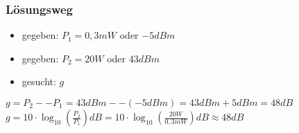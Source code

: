 \begin{frame}
\frametitle{Lösungsweg}
\begin{itemize}
  \item gegeben: $P_1 = 0,3mW$ oder $-5dBm$
  \item gegeben: $P_2 = 20W$ oder $43dBm$
  \item gesucht: $g$
  \end{itemize}
    \pause
    $g = P_2 -- P_1 = 43dBm -- (-5dBm) = 43dBm + 5dBm = 48dB$
    \pause
    $g = 10 \cdot \log_{10}{(\frac{P_2}{P_1})}dB = 10 \cdot \log_{10}{(\frac{20W}{0,3mW})}dB \approx 48dB$



\end{frame}%
